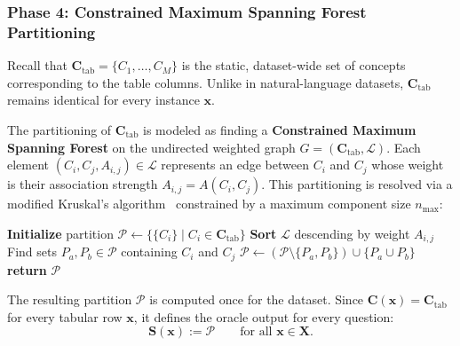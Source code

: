 \subsubsection{Phase 4: Constrained Maximum Spanning Forest Partitioning}

Recall that $\mathbf{C}_{\mathrm{tab}} = \{C_1, \ldots, C_M\}$ is the static, dataset-wide set of concepts corresponding to the table columns. Unlike in natural-language datasets, $\mathbf{C}_{\mathrm{tab}}$ remains identical for every instance $\mathbf{x}$.

The partitioning of $\mathbf{C}_{\mathrm{tab}}$ is modeled as finding a \textbf{Constrained Maximum Spanning Forest} on the undirected weighted graph $G = (\mathbf{C}_{\mathrm{tab}}, \mathcal{L})$. Each element $(C_i,C_j,A_{i,j})\in\mathcal{L}$ represents an edge between $C_i$ and $C_j$ whose weight is their association strength $A_{i,j}=A(C_i,C_j)$. This partitioning is resolved via a modified Kruskal's algorithm~\cite{kruskalShortestSpanningSubtree1956} constrained by a maximum component size $n_{\max}$:

\begin{algorithm}[H]
	\caption[Constrained greedy partitioning of strongest associations]{Constrained greedy partitioning of strongest associations.}\label{alg:greedy_merge}
	\begin{algorithmic}[1]
		\State \textbf{Initialize} partition $\mathcal{P} \gets \{ \{C_i\} \mid C_i \in \mathbf{C}_{\mathrm{tab}} \}$ 
		\State \textbf{Sort} $\mathcal{L}$ descending by weight $A_{i,j}$
		\State Find sets $P_a, P_b \in \mathcal{P}$ containing $C_i$ and $C_j$
		\State $\mathcal{P} \gets \left( \mathcal{P} \setminus \{P_a, P_b\} \right) \cup \{P_a \cup P_b\}$ 
		\EndIf
		\EndFor
		\State \textbf{return} $\mathcal{P}$
	\end{algorithmic}
\end{algorithm}

The resulting partition $\mathcal{P}$ is computed once for the dataset. Since $\mathbf{C}(\mathbf{x})=\mathbf{C}_{\mathrm{tab}}$ for every tabular row $\mathbf{x}$, it defines the oracle output for every question:
\begin{equation}
	\mathbf{S}(\mathbf{x}) := \mathcal{P}
	\qquad \text{for all } \mathbf{x}\in\mathbf{X}.
\end{equation}

